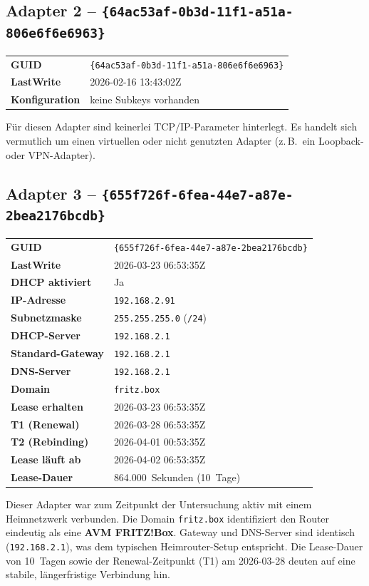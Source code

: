 \subsection*{Adapter 2 – \texttt{\{64ac53af-0b3d-11f1-a51a-806e6f6e6963\}}}

\begin{tabular}{ll}
	\textbf{GUID}            & \texttt{\{64ac53af-0b3d-11f1-a51a-806e6f6e6963\}} \\
	\textbf{LastWrite}       & 2026-02-16 13:43:02Z \\
	\textbf{Konfiguration}   & keine Subkeys vorhanden \\
\end{tabular}

\medskip
\noindent
Für diesen Adapter sind keinerlei TCP/IP-Parameter hinterlegt. Es handelt sich
vermutlich um einen virtuellen oder nicht genutzten Adapter (z.\,B.\ ein
Loopback- oder VPN-Adapter).

\subsection*{Adapter 3 – \texttt{\{655f726f-6fea-44e7-a87e-2bea2176bcdb\}}}

\begin{tabular}{ll}
	\textbf{GUID}              & \texttt{\{655f726f-6fea-44e7-a87e-2bea2176bcdb\}} \\
	\textbf{LastWrite}         & 2026-03-23 06:53:35Z \\
	\textbf{DHCP aktiviert}    & Ja \\
	\textbf{IP-Adresse}        & \texttt{192.168.2.91} \\
	\textbf{Subnetzmaske}      & \texttt{255.255.255.0} (\texttt{/24}) \\
	\textbf{DHCP-Server}       & \texttt{192.168.2.1} \\
	\textbf{Standard-Gateway}  & \texttt{192.168.2.1} \\
	\textbf{DNS-Server}        & \texttt{192.168.2.1} \\
	\textbf{Domain}            & \texttt{fritz.box} \\
	\textbf{Lease erhalten}    & 2026-03-23 06:53:35Z \\
	\textbf{T1 (Renewal)}      & 2026-03-28 06:53:35Z \\
	\textbf{T2 (Rebinding)}    & 2026-04-01 00:53:35Z \\
	\textbf{Lease läuft ab}    & 2026-04-02 06:53:35Z \\
	\textbf{Lease-Dauer}       & 864.000~Sekunden (10~Tage) \\
\end{tabular}

\medskip
\noindent
Dieser Adapter war zum Zeitpunkt der Untersuchung aktiv mit einem Heimnetzwerk
verbunden. Die Domain \texttt{fritz.box} identifiziert den Router eindeutig als
eine \textbf{AVM FRITZ!Box}. Gateway und DNS-Server sind identisch
(\texttt{192.168.2.1}), was dem typischen Heimrouter-Setup entspricht.
Die Lease-Dauer von 10~Tagen sowie der Renewal-Zeitpunkt (T1) am 2026-03-28
deuten auf eine stabile, längerfristige Verbindung hin.
